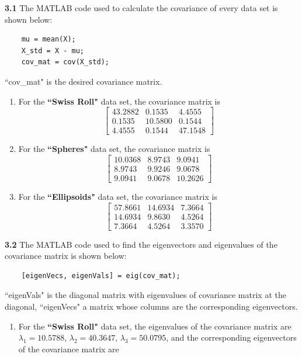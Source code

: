 \documentclass[a4paper]{article}
\begin{document}
\begin{spacing}{2.0}
	\textbf{3.1} 
	The MATLAB code used to calculate the covariance of every data set is shown below:
	\begin{lstlisting}
	mu = mean(X);
	X_std = X - mu;
	cov_mat = cov(X_std);
	\end{lstlisting}
	 ``cov\_mat" is the desired covariance matrix. 
	 
	 \begin{enumerate}[-]
	 
	 \item
	 For the \textbf{``Swiss Roll"} data set, the covariance matrix is 
	 $$\left[\begin{matrix} 43.2882 & 0.1535 & 4.4555 \\ 0.1535 & 10.5800 & 0.1544 \\ 4.4555 & 0.1544 & 47.1548 \end{matrix}\right]$$
	 
	 \item
	 For the \textbf{``Spheres"} data set, the covariance matrix is
	 $$\left[\begin{matrix} 10.0368 & 8.9743 & 9.0941 \\ 8.9743 & 9.9246 & 9.0678 \\ 9.0941 & 9.0678 & 10.2626 \end{matrix}\right]$$
	 
	 \item
	  For the \textbf{``Ellipsoids"} data set, the covariance matrix is
	 $$\left[\begin{matrix} 57.8661 & 14.6934 & 7.3664 \\ 14.6934 & 9.8630 & 4.5264 \\ 7.3664 & 4.5264 & 3.3570 \end{matrix}\right]$$
	\end{enumerate}
	
	\textbf{3.2}  
	The MATLAB code used to find the eigenvectors and eigenvalues of the covariance matrix is shown below:
	\begin{lstlisting}
	[eigenVecs, eigenVals] = eig(cov_mat);
	\end{lstlisting}
	``eigenVals" is the diagonal matrix with eigenvalues of covariance matrix at the diagonal, ``eigenVecs" a matrix whose columns are the         		corresponding eigenvectors.
	\begin{enumerate}[-]
	
	\item
	For the \textbf{``Swiss Roll"} data set, the eigenvalues of the covariance matrix are $\lambda_1 = 10.5788$, $\lambda_2 = 40.3647$, $\lambda_3 = 	50.0795$, and the corresponding eigenvectors of the covariance matrix are\\
	

\end{enumerate}
\end{spacing}
\end{document}
